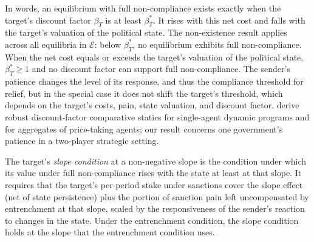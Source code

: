 In words, an equilibrium with full non-compliance exists
exactly when the target's discount factor $\beta_T$ is at least $\beta_T^*$. It rises with this net cost and falls with the target's
valuation of the political state. The non-existence result applies across all
equilibria in $\mathcal E$: below $\beta_T^*$, no equilibrium exhibits full
non-compliance. When the net cost equals or exceeds the target's valuation of the
political state, $\beta_T^*\ge1$ and no discount factor can support full
non-compliance. The sender's patience changes the level of its response, and thus the
compliance threshold for relief, but in the special case it does not shift the target's
threshold, which depends on the target's costs, pain, state valuation, and discount
factor. \citet[Lemma~2, Proposition~1]{AcemogluJensen2015} derive robust
discount-factor comparative statics for single-agent dynamic programs and for
aggregates of price-taking agents; our result concerns one government's patience in a
two-player strategic setting.

 The target's \emph{slope
condition} at a non-negative slope is the condition under which its value under full
non-compliance rises with the state at least at that slope. It requires that the
target's per-period stake under sanctions cover the slope effect (net of state
persistence) plus the portion of sanction pain left uncompensated by entrenchment at
that slope, scaled by the responsiveness of the sender's reaction to changes in the
state. Under the entrenchment condition, the slope condition holds at the slope that
the entrenchment condition uses.

